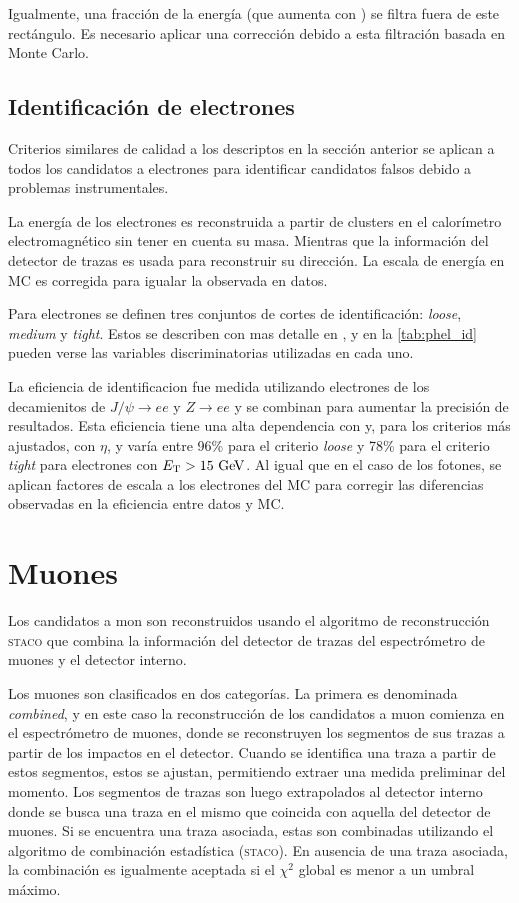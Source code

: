 Igualmente, una fracción de la energía (que aumenta con {\pt}) se filtra fuera de
este rectángulo. Es necesario aplicar una corrección debido a esta filtración
basada en Monte Carlo.


\subsection{Identificación de electrones}
\label{sec:elec_obj}

Criterios similares de calidad a los descriptos en la sección anterior
se aplican a todos los candidatos a electrones para identificar candidatos
falsos debido a problemas instrumentales.

La energía de los electrones es reconstruida a partir de clusters en el calorímetro
electromagnético sin tener en cuenta su masa. Mientras que la información del
detector de trazas es usada para reconstruir su dirección. La escala de energía
en MC es corregida para igualar la observada en datos.

Para electrones se definen tres conjuntos de cortes de identificación: \emph{loose}, \emph{medium} y
\emph{tight}. Estos se describen con mas detalle en \cite{ATL-PHYS-PUB-2011-007}, y
en la \cref{tab:phel_id} pueden verse las variables discriminatorias utilizadas
en cada uno.

La eficiencia de identificacion fue medida utilizando electrones de los
decamienitos de $J/\psi\to ee$ y $Z\to ee$ y se combinan para aumentar la
precisión de resultados. Esta eficiencia tiene una alta dependencia con {\et} y, para
los criterios más ajustados, con $\eta$, y varía entre 96\% para el criterio
\emph{loose} y 78\% para el criterio \emph{tight} para electrones con $\et>15\gev$.
Al igual que en el caso de los fotones, se aplican factores de escala
a los electrones del MC para corregir las diferencias observadas en la
eficiencia entre datos y MC.


\section{Muones}
\label{sec:muon_obj}

Los candidatos a mon son reconstruidos usando el algoritmo de reconstrucción
\textsc{staco}\cite{ATLAS_TDR1} que combina la información del detector de
trazas del espectrómetro de muones y el detector interno.

Los muones son clasificados en dos categorías. La primera es denominada
\emph{combined}, y en este caso la reconstrucción de los candidatos a muon
comienza en el espectrómetro de muones, donde se reconstruyen
los segmentos de sus trazas a partir de los impactos en el detector.
Cuando se identifica una traza a partir de estos segmentos, estos se ajustan,
permitiendo extraer una medida preliminar del momento. Los segmentos de trazas
son luego extrapolados al detector interno donde se busca una traza en el mismo
que coincida con aquella del detector de muones.
Si se encuentra una traza asociada, estas son combinadas utilizando el algoritmo
de combinación estadística (\textsc{staco}). En ausencia de una traza asociada,
la combinación es igualmente aceptada si el $\chi^2$ global es menor a un umbral
máximo.

